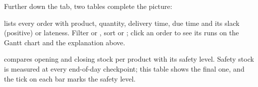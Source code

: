 Further down the tab, two tables complete the picture:


 lists every order with product, quantity, delivery time, due time and its slack (positive) or
lateness. Filter  or , sort  or ; click an order to see
its runs on the Gantt chart and the explanation above.


 compares opening and closing stock per product with its safety level. Safety
stock is measured at every end-of-day checkpoint; this table shows the final one, and the tick on each bar
marks the safety level.
